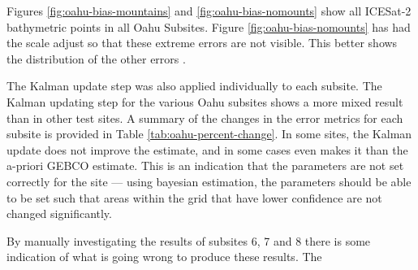 Figures \ref{fig:oahu-bias-mountains} and \ref{fig:oahu-bias-nomounts} show all ICESat-2 bathymetric points in all Oahu Subsites. Figure \ref{fig:oahu-bias-nomounts} has had the scale adjust so that these extreme errors are not visible. This better shows the distribution of the other errors .

The Kalman update step was also applied individually to each subsite. The Kalman updating step for the various Oahu subsites shows a more mixed result than in other test sites. A summary of the changes in the error metrics for each subsite is provided in Table \ref{tab:oahu-percent-change}. In some sites, the Kalman update does not improve the estimate, and in some cases even makes it than the a-priori GEBCO estimate. This is an indication that the parameters are not set correctly for the site --- using bayesian estimation, the parameters should be able to be set such that areas within the grid that have lower confidence are not changed significantly. 

By manually investigating the results of subsites 6, 7 and 8 there is some indication of what is going wrong to produce these results. The 



